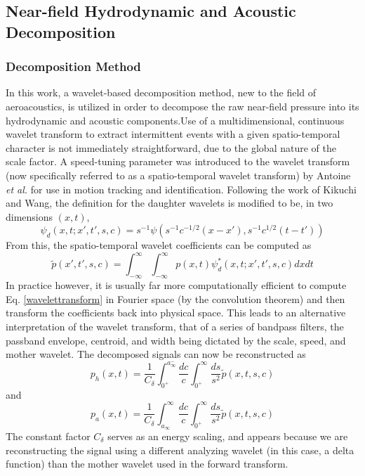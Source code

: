 \documentclass[english]{aiaa-tc}
\begin{document}
\subsection{Near-field Hydrodynamic and Acoustic Decomposition}\label{wavletdecomp}
\subsubsection{Decomposition Method}
In this work, a wavelet-based decomposition method, new to the field of aeroacoustics, is utilized in order to decompose the raw near-field pressure into its hydrodynamic and acoustic components.Use of a multidimensional, continuous wavelet transform to extract intermittent events with a given spatio-temporal character is not immediately straightforward, due to the global nature of the scale factor. A speed-tuning parameter was introduced to the wavelet transform (now specifically referred to as a spatio-temporal wavelet transform) by Antoine {\em et al.}\cite{Antoine2004} for use in motion tracking and identification. Following the work of Kikuchi and Wang\cite{Kikuchi2010}, the definition for the daughter wavelets is modified to be, in two dimensions $(x,t)$, 
\begin{equation}
\psi_{d}(x,t;x',t',s,c)=s^{-1}\psi \left( s^{-1}c^{-1/2}(x-x'),s^{-1}c^{1/2}(t-t') \right)
\end{equation}
From this, the spatio-temporal wavelet coefficients can be computed as
\begin{equation}\label{wavelettransform}
\tilde{p}(x',t',s,c)=\int_{-\infty}^{\infty}\int_{-\infty}^{\infty}p(x,t)\psi^{*}_{d}(x,t;x',t',s,c)dxdt 
\end{equation}
In practice however, it is usually far more computationally efficient to compute Eq. \ref{wavelettransform} in Fourier space (by the convolution theorem) and then transform the coefficients back into physical space. This leads to an alternative interpretation of the wavelet transform, that of a series of bandpass filters, the passband envelope, centroid, and width being dictated by the scale, speed, and mother wavelet\cite{Torrence1998,Farge1992,Antoine2004}. The decomposed signals can now be reconstructed as
\begin{equation}
p_{h}(x,t) = \frac{1}{C_{\delta}}\int_{0^{+}}^{a_{\infty}^{-}}\frac{dc}{c}\int_{0^{+}}^{\infty}\frac{ds}{s^{2}}\tilde{p}(x,t,s,c)
\end{equation}
and
\begin{equation}
p_{a}(x,t) = \frac{1}{C_{\delta}}\int_{a_{\infty}}^{\infty}\frac{dc}{c}\int_{0^{+}}^{\infty}\frac{ds}{s^{2}}\tilde{p}(x,t,s,c)
\end{equation}
The constant factor $C_{\delta}$ serves as an energy scaling, and appears because we are reconstructing the signal using a different analyzing wavelet (in this case, a delta function) than the mother wavelet used in the forward transform\cite{Torrence1998,Farge1992}.
\end{document}
